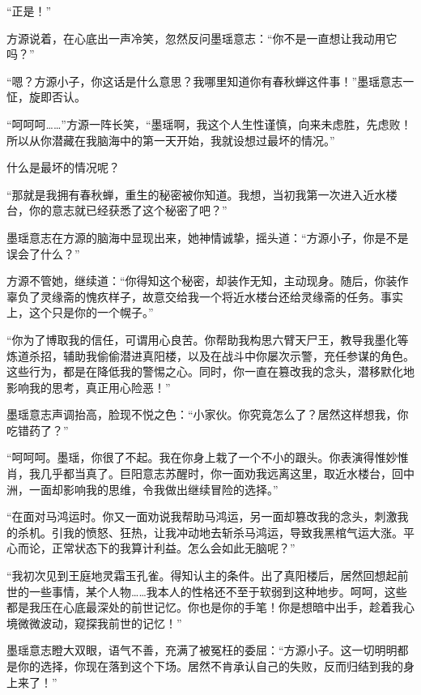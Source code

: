 
\begin{this_body}

“正是！”

方源说着，在心底出一声冷笑，忽然反问墨瑶意志：“你不是一直想让我动用它吗？”

“嗯？方源小子，你这话是什么意思？我哪里知道你有春秋蝉这件事！”墨瑶意志一怔，旋即否认。

“呵呵呵……”方源一阵长笑，“墨瑶啊，我这个人生性谨慎，向来未虑胜，先虑败！所以从你潜藏在我脑海中的第一天开始，我就设想过最坏的情况。”

什么是最坏的情况呢？

“那就是我拥有春秋蝉，重生的秘密被你知道。我想，当初我第一次进入近水楼台，你的意志就已经获悉了这个秘密了吧？”

墨瑶意志在方源的脑海中显现出来，她神情诚挚，摇头道：“方源小子，你是不是误会了什么？”

方源不管她，继续道：“你得知这个秘密，却装作无知，主动现身。随后，你装作辜负了灵缘斋的愧疚样子，故意交给我一个将近水楼台还给灵缘斋的任务。事实上，这个只是你的一个幌子。”

“你为了博取我的信任，可谓用心良苦。你帮助我构思六臂天尸王，教导我墨化等炼道杀招，辅助我偷偷潜进真阳楼，以及在战斗中你屡次示警，充任参谋的角色。这些行为，都是在降低我的警惕之心。同时，你一直在篡改我的念头，潜移默化地影响我的思考，真正用心险恶！”

墨瑶意志声调抬高，脸现不悦之色：“小家伙。你究竟怎么了？居然这样想我，你吃错药了？”

“呵呵呵。墨瑶，你很了不起。我在你身上栽了一个不小的跟头。你表演得惟妙惟肖，我几乎都当真了。巨阳意志苏醒时，你一面劝我远离这里，取近水楼台，回中洲，一面却影响我的思维，令我做出继续冒险的选择。”

“在面对马鸿运时。你又一面劝说我帮助马鸿运，另一面却篡改我的念头，刺激我的杀机。引我的愤怒、狂热，让我冲动地去斩杀马鸿运，导致我黑棺气运大涨。平心而论，正常状态下的我算计利益。怎么会如此无脑呢？”

“我初次见到王庭地灵霜玉孔雀。得知认主的条件。出了真阳楼后，居然回想起前世的一些事情，某个人物……我本人的性格还不至于软弱到这种地步。呵呵，这些都是我压在心底最深处的前世记忆。你也是你的手笔！你是想暗中出手，趁着我心境微微波动，窥探我前世的记忆！”

墨瑶意志瞪大双眼，语气不善，充满了被冤枉的委屈：“方源小子。这一切明明都是你的选择，你现在落到这个下场。居然不肯承认自己的失败，反而归结到我的身上来了！”


\end{this_body}
